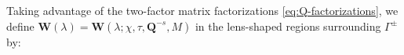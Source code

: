 Taking advantage of the two-factor matrix factorizations \eqref{eq:Q-factorizations}, we define $\mathbf{W}(\lambda)=\mathbf{W}(\lambda;\chi,\tau,\mathbf{Q}^{-s},M)$ in the lens-shaped regions surrounding $\Gamma^\pm$ by:

